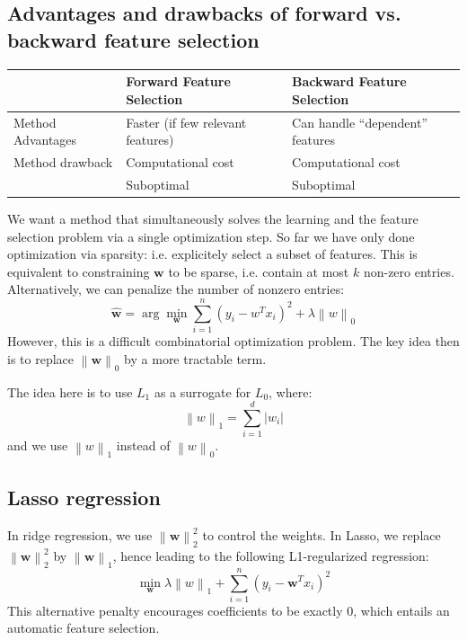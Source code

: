 \documentclass[a4paper,10pt,twoside]{article}
\newcommand\norm[1]{\left\lVert#1\right\rVert}
\begin{document}
\subsection{Advantages and drawbacks of forward vs. backward feature selection}
\begin{table}[htbp]
    \centering
    \begin{tabular}{lll}
        \toprule
        & Forward Feature Selection & Backward Feature Selection\\
        \midrule
        Method Advantages & Faster (if few relevant features) & Can handle ``dependent'' features\\
        \midrule
        Method drawback & Computational cost & Computational cost \\
        \midrule
        & Suboptimal & Suboptimal \\
        \bottomrule
    \end{tabular}
\end{table}

We want a method that simultaneously solves the learning and the feature selection problem via a single optimization step. So far we have only done optimization via sparsity: i.e. explicitely select a subset of features. This is equivalent to constraining $\mathbf{w}$ to be sparse, i.e. contain at most $k$ non-zero entries. Alternatively, we can penalize the number of nonzero entries: 
\begin{equation*}
    \hat{\mathbf{w}} = \arg\min_{\mathbf{w}}\sum_{i=1}^{n}(y_i-w^Tx_i)^2+\lambda \norm{w}_0
\end{equation*}
However, this is a difficult combinatorial optimization problem. The key idea then is to replace $\norm{\mathbf{w}}_0$ by a more tractable term. 

The idea here is to use $L_1$ as a surrogate for $L_0$, where:
\begin{equation*}
    \norm{w}_1=\sum_{i=1}^{d}|w_i|
\end{equation*}
and we use $\norm{w}_1$ instead of $\norm{w}_0$.

\subsection{Lasso regression}

In ridge regression, we use $\norm{\mathbf{w}}_2^2$ to control the weights. In Lasso, we replace $\norm{\mathbf{w}}_2^2$ by $\norm{\mathbf{w}}_1$, hence leading to the following L1-regularized regression:
\begin{equation*}
    \min_{\mathbf{w}}\lambda\norm{w}_1+\sum_{i=1}^{n}(y_i-\mathbf{w}^Tx_i)^2
\end{equation*}
This alternative penalty encourages coefficients to be exactly 0, which entails an automatic feature selection.
\end{document}

